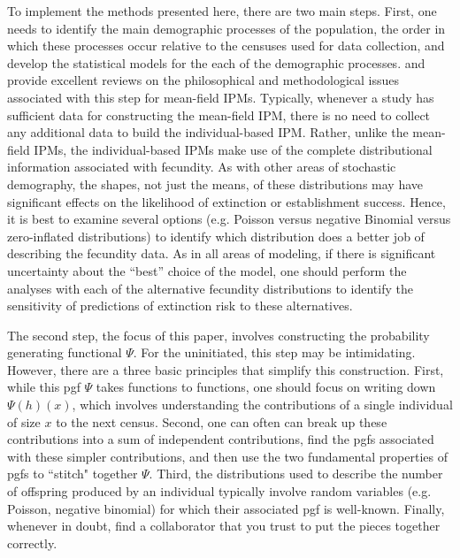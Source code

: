 \documentclass[12pt]{amsart}\usepackage[]{graphicx}\usepackage[]{color}
\begin{document}
To implement the methods presented here, there are two main steps. First, one needs to identify the main demographic processes of the population, the order in which these processes occur relative to the censuses used for data collection, and develop the statistical models for the each of the demographic processes. \citet{rees-etal-14} and \citet{merow-etal-14} provide excellent reviews on the philosophical and methodological issues associated with this step for mean-field IPMs. Typically, whenever a study has sufficient data for constructing the mean-field IPM, there is no need to collect any additional data to build the individual-based IPM.  Rather, unlike the mean-field IPMs, the individual-based IPMs make use of the complete distributional information associated with fecundity. As with other areas of stochastic demography, the shapes, not just the means, of these distributions may have significant effects on the likelihood of extinction or establishment success. Hence, it is best to examine several options (e.g. Poisson versus negative Binomial versus zero-inflated distributions) to identify which distribution does a better job of describing the fecundity data. As in all areas of modeling, if there is significant uncertainty about the ``best'' choice of the model, one should perform the analyses with each of the alternative fecundity distributions to identify the sensitivity of predictions of extinction risk to these alternatives.

The second step, the focus of this paper, involves constructing the probability generating functional $\Psi$. For the uninitiated, this step may be intimidating. However, there are a three basic principles that simplify this construction. First, while this pgf $\Psi$ takes functions to functions, one should focus on writing down $\Psi(h)(x)$, which involves understanding the contributions of a single individual of size $x$ to the next census. Second, one can often can break up these contributions into a sum of independent contributions, find the pgfs associated with these simpler contributions, and then use the two fundamental properties of pgfs to ``stitch" together $\Psi$. Third, the distributions used to describe the number of offspring produced by an individual typically involve random variables (e.g. Poisson, negative binomial) for which their associated pgf is well-known. Finally, whenever in doubt, find a collaborator that you trust to put the pieces together correctly.
\end{document}
